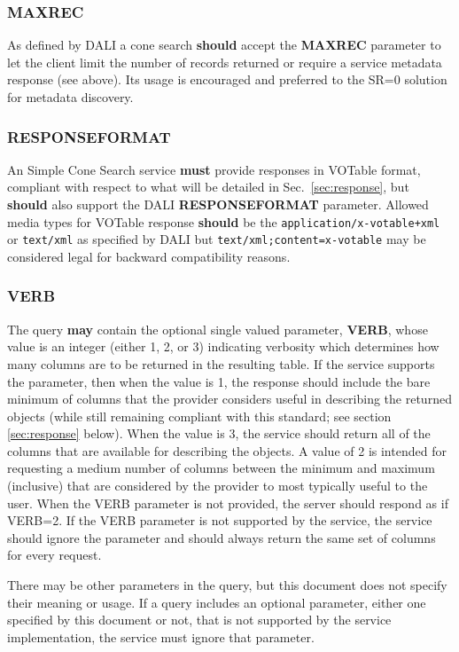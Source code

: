 \documentclass[11pt,a4paper]{ivoa}
\begin{document}
\subsubsection{MAXREC} As defined by DALI a cone search \textbf{should}
accept the \textbf{MAXREC} parameter to let the client limit the number
of records returned or require a service metadata response (see above).
Its usage is encouraged and preferred to the SR=0 solution for metadata
discovery.

\subsubsection{RESPONSEFORMAT} \label{subsubsec:responseformat} An
Simple Cone Search service \textbf{must} provide responses in VOTable
\citep{std:VOTABLE} format, compliant with respect to what will be
detailed in Sec.~\ref{sec:response}, but \textbf{should} also support
the DALI \textbf{RESPONSEFORMAT} parameter. Allowed media types for
VOTable response \textbf{should} be the
\texttt{application/x-votable+xml} or \texttt{text/xml} as specified by
DALI but \texttt{text/xml;content=x-votable} may be considered legal for
backward compatibility reasons.

\subsubsection{VERB} The query \textbf{may} contain the optional single
valued parameter, \textbf{VERB}, whose value is an integer (either 1, 2,
or 3) indicating verbosity which determines how many columns are to be
returned in the resulting table. If the service supports the parameter,
then when the value is 1, the response should include the bare minimum
of columns that the provider considers useful in describing the returned
objects (while still remaining compliant with this standard; see section
\ref{sec:response} below). When the value is 3, the service should
return all of the columns that are available for describing the objects.
A value of 2 is intended for requesting a medium number of columns
between the minimum and maximum (inclusive) that are considered by the
provider to most typically useful to the user. When the VERB parameter
is not provided, the server should respond as if VERB=2. If the VERB
parameter is not supported by the service, the service should ignore the
parameter and should always return the same set of columns for every
request.

There may be other parameters in the query, but this document does not
specify their meaning or usage. If a query includes an optional
parameter, either one specified by this document or not, that is not
supported by the service implementation, the service must ignore that
parameter.
\end{document}
